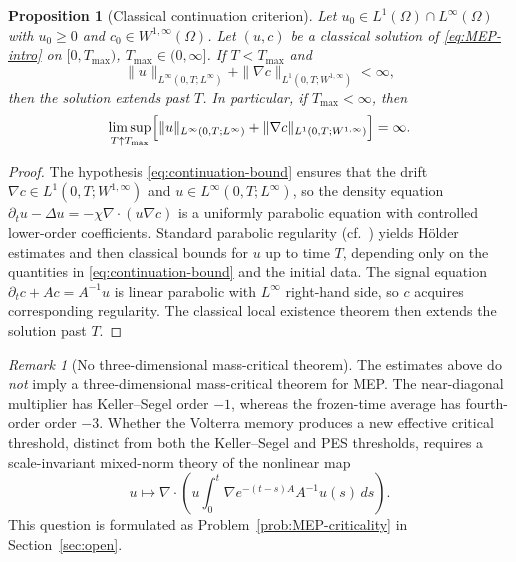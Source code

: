 \documentclass[11pt,reqno]{amsart}
\newtheorem{proposition}[theorem]{Proposition}
\theoremstyle{definition}
\theoremstyle{remark}
\newtheorem{remark}[theorem]{Remark}
\newcommand{\Div}{\nabla\!\cdot}
\begin{document}
\begin{proposition}[Classical continuation criterion]\label{prop:MEP-continuation}
Let $u_0\in L^{1}(\Omega)\cap L^{\infty}(\Omega)$ with $u_0\ge 0$ and $c_0\in W^{1,\infty}(\Omega)$. Let $(u,c)$ be a classical solution of \eqref{eq:MEP-intro} on $[0,T_{\max})$, $T_{\max}\in (0,\infty]$. If $T<T_{\max}$ and
\begin{equation}\label{eq:continuation-bound}
        \|u\|_{L^{\infty}(0,T;L^{\infty})}+\|\nabla c\|_{L^{1}(0,T;W^{1,\infty})}<\infty,
\end{equation}
then the solution extends past $T$. In particular, if $T_{\max}<\infty$, then
\begin{equation}\label{eq:blowup-alternative}
        \limsup_{T\uparrow T_{\max}}\Bigl[\|u\|_{L^{\infty}(0,T;L^{\infty})}+\|\nabla c\|_{L^{1}(0,T;W^{1,\infty})}\Bigr]=\infty.
\end{equation}
\end{proposition}

\begin{proof}
The hypothesis \eqref{eq:continuation-bound} ensures that the drift $\nabla c\in L^{1}(0,T;W^{1,\infty})$ and $u\in L^{\infty}(0,T;L^{\infty})$, so the density equation $\partial_t u-\Delta u=-\chi\Div(u\nabla c)$ is a uniformly parabolic equation with controlled lower-order coefficients. Standard parabolic regularity (cf.~\cite{ladyzhenskaia1968linear}) yields Hölder estimates and then classical bounds for $u$ up to time $T$, depending only on the quantities in \eqref{eq:continuation-bound} and the initial data. The signal equation $\partial_t c+Ac=A^{-1}u$ is linear parabolic with $L^{\infty}$ right-hand side, so $c$ acquires corresponding regularity. The classical local existence theorem then extends the solution past $T$.
\end{proof}

\begin{remark}[No three-dimensional mass-critical theorem]\label{rem:no-3D-MEP}
The estimates above do \emph{not} imply a three-dimensional mass-critical theorem for MEP. The near-diagonal multiplier has Keller--Segel order $-1$, whereas the frozen-time average has fourth-order order $-3$. Whether the Volterra memory produces a new effective critical threshold, distinct from both the Keller--Segel and PES thresholds, requires a scale-invariant mixed-norm theory of the nonlinear map
\[
        u\longmapsto\Div\!\left(u\int_0^t\nabla e^{-(t-s)A}A^{-1}u(s)\,ds\right).
\]
This question is formulated as Problem~\ref{prob:MEP-criticality} in Section~\ref{sec:open}.
\end{remark}
\end{document}
